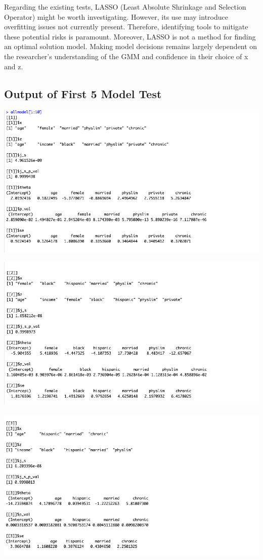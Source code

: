 \documentclass[12pt]{article}
\begin{document}
Regarding the existing tests, LASSO (Least Absolute Shrinkage and Selection Operator) might be worth investigating. However, its use may introduce overfitting issues not currently present. Therefore, identifying tools to mitigate these potential risks is paramount. Moreover, LASSO is not a method for finding an optimal solution model. Making model decisions remains largely dependent on the researcher's understanding of the GMM and confidence in their choice of x and z.


\subsection{Output of First 5 Model Test}
\hypertarget{Y}{ }

\includegraphics{1.png}

\includegraphics{2.png}

\includegraphics{3.png}
\end{document}
